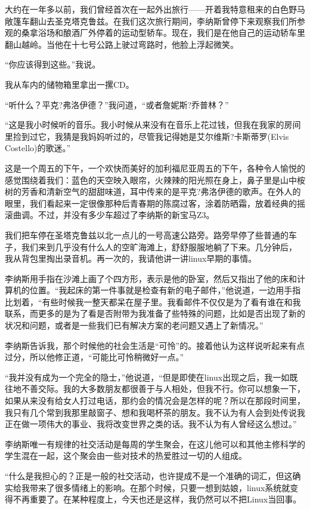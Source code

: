 大约在一年多以前，我们曾经首次在一起外出旅行——开着我特意租来的白色野马敞篷车翻山去圣克塔克鲁兹。在我们这次旅行期间，李纳斯曾停下来观察我们所参观的桑拿浴场和酿酒厂外停着的运动型轿车。现在，我们是在他自己的运动轿车里翻山越岭。当他在十七号公路上驶过弯路时，他脸上浮起微笑。

“你应该得到这些。”我说。

我从车内的储物箱里拿出一摞CD。

“听什么？平克?弗洛伊德？”我问道，“或者詹妮斯?乔普林？”

“这是我小时候听的音乐。我小时候从来没有在音乐上花过钱，但我在我家的房间里捡到过它，我猜是我妈妈听过的，尽管我记得她是艾尔维斯?卡斯蒂罗(Elvis Costello)的歌迷。”

这是一个周五的下午，一个欢快而美好的加利福尼亚周五的下午，各种令人愉悦的感觉围绕着我们：蓝色的天空映入眼帘，火辣辣的阳光照在身上，鼻子里是山中桉树的芳香和清新空气的甜甜味道，耳中传来的是平克?弗洛伊德的歌声。在外人的眼里，我们看起来一定很像那种后青春期的陈腐过客，涂着防晒霜，放着经典的摇滚曲调。不过，并没有多少车超过了李纳斯的新宝马Z3。

我们把车停在圣塔克鲁兹以北一点儿的一号高速公路旁。路旁早停了些普通的车子，我们来到几乎没有什么人的空旷海滩上，舒舒服服地躺了下来。几分钟后， 我从背包里掏出录音机。再一次的，我请他讲一讲linux早期的事情。

李纳斯用手指在沙滩上画了个四方形，表示是他的卧室，然后又指出了他的床和计算机的位置。“我起床的第一件事就是检查有新的电子邮件，”他说道，一边用手指比划着，“有些时候我一整天都呆在屋子里。我看邮件不仅仅是为了看有谁在和我联系，而更多的是为了看是否附带为我准备了些特殊的问题，比如是否出现了新的状况和问题，或者是一些我们已有解决方案的老问题又遇上了新情况。”

李纳斯告诉我，那个时候他的社会生活是“可怜”的。接着他认为这样说听起来有点过分，所以他修正道，“可能比可怜稍微好一点。”

“我并没有成为一个完全的隐士，”他说道，“但是即使在linux出现之后，我一如既往地不善交际。我的大多数朋友都很善于与人相处，但我不行。你可以想象一下，如果从来没有给女人打过电话，那约会的情况会是怎样的呢？所以在那段时间里，我只有几个常到我那里敲窗子、想和我喝杯茶的朋友。我不认为有人会到处传说我正在做一项伟大的事业、我将改变世界之类的话。我不认为有人曾经这么想过。”

李纳斯唯一有规律的社交活动是每周的学生聚会，在这儿他可以和其他主修科学的学生混在一起，这个聚会由一些对技术的热爱胜过一切的人组成。

“什么是我担心的？正是一般的社交活动，也许提成不是一个准确的词汇，但这确实给我带来了很多情绪上的影响。在那个时候，只要一想到姑娘，linux系统就变得不再重要了。在某种程度上，今天也还是这样，我仍然可以不把Linux当回事。

